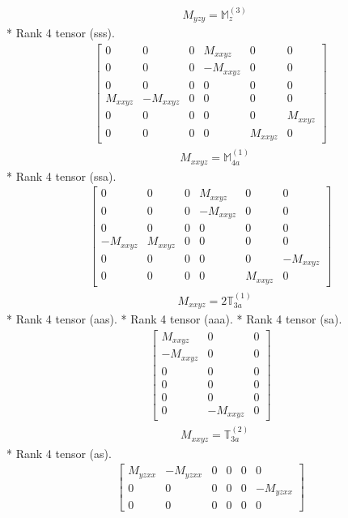 \documentclass[fleqn,8pt,landscape]{jsarticle}
\begin{document}
\begin{align*}
& M_{yzy} = \mathbb{M}_{z}^{(3)}
\end{align*}
* Rank 4 tensor (sss).
\begin{align*}
\begin{bmatrix} 0 & 0 & 0 & M_{xxyz} & 0 & 0 \\ 0 & 0 & 0 & - M_{xxyz} & 0 & 0 \\ 0 & 0 & 0 & 0 & 0 & 0 \\ M_{xxyz} & - M_{xxyz} & 0 & 0 & 0 & 0 \\ 0 & 0 & 0 & 0 & 0 & M_{xxyz} \\ 0 & 0 & 0 & 0 & M_{xxyz} & 0 \end{bmatrix}
\end{align*}
\begin{align*}
& M_{xxyz} = \mathbb{M}_{4a}^{(1)}
\end{align*}
* Rank 4 tensor (ssa).
\begin{align*}
\begin{bmatrix} 0 & 0 & 0 & M_{xxyz} & 0 & 0 \\ 0 & 0 & 0 & - M_{xxyz} & 0 & 0 \\ 0 & 0 & 0 & 0 & 0 & 0 \\ - M_{xxyz} & M_{xxyz} & 0 & 0 & 0 & 0 \\ 0 & 0 & 0 & 0 & 0 & - M_{xxyz} \\ 0 & 0 & 0 & 0 & M_{xxyz} & 0 \end{bmatrix}
\end{align*}
\begin{align*}
& M_{xxyz} = 2 \mathbb{T}_{3a}^{(1)}
\end{align*}
* Rank 4 tensor (aas).
* Rank 4 tensor (aaa).
* Rank 4 tensor (sa).
\begin{align*}
\begin{bmatrix} M_{xxyz} & 0 & 0 \\ - M_{xxyz} & 0 & 0 \\ 0 & 0 & 0 \\ 0 & 0 & 0 \\ 0 & 0 & 0 \\ 0 & - M_{xxyz} & 0 \end{bmatrix}
\end{align*}
\begin{align*}
& M_{xxyz} = \mathbb{T}_{3a}^{(2)}
\end{align*}
* Rank 4 tensor (as).
\begin{align*}
\begin{bmatrix} M_{yzxx} & - M_{yzxx} & 0 & 0 & 0 & 0 \\ 0 & 0 & 0 & 0 & 0 & - M_{yzxx} \\ 0 & 0 & 0 & 0 & 0 & 0 \end{bmatrix}
\end{align*}
\end{document}
